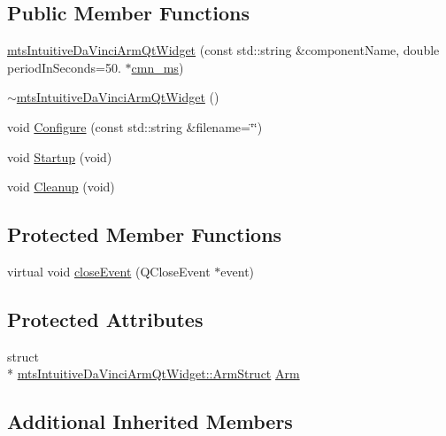 \subsection*{Public Member Functions}
\begin{DoxyCompactItemize}
\item 
\hyperlink{classmts_intuitive_da_vinci_arm_qt_widget_a7e774607fa791454a8e436937404a1ec}{mts\-Intuitive\-Da\-Vinci\-Arm\-Qt\-Widget} (const std\-::string \&component\-Name, double period\-In\-Seconds=50. $\ast$\hyperlink{cmn_units_8h_aaf4d3f2fafb9b4a95606544b9d876b4a}{cmn\-\_\-ms})
\item 
\hyperlink{classmts_intuitive_da_vinci_arm_qt_widget_a3bdf073035b4abc7b533f66a073bfc50}{$\sim$mts\-Intuitive\-Da\-Vinci\-Arm\-Qt\-Widget} ()
\item 
void \hyperlink{classmts_intuitive_da_vinci_arm_qt_widget_ad8228e228cddf61ac848b5799785fb23}{Configure} (const std\-::string \&filename=\char`\"{}\char`\"{})
\item 
void \hyperlink{classmts_intuitive_da_vinci_arm_qt_widget_a650fc8e658ab975458072974e77b46f9}{Startup} (void)
\item 
void \hyperlink{classmts_intuitive_da_vinci_arm_qt_widget_ad8d66f1c511581101f3fb1512bbd6d2b}{Cleanup} (void)
\end{DoxyCompactItemize}
\subsection*{Protected Member Functions}
\begin{DoxyCompactItemize}
\item 
virtual void \hyperlink{classmts_intuitive_da_vinci_arm_qt_widget_aab5e40c10f4f3164ab37344ef2ab0058}{close\-Event} (Q\-Close\-Event $\ast$event)
\end{DoxyCompactItemize}
\subsection*{Protected Attributes}
\begin{DoxyCompactItemize}
\item 
struct \\*
\hyperlink{structmts_intuitive_da_vinci_arm_qt_widget_1_1_arm_struct}{mts\-Intuitive\-Da\-Vinci\-Arm\-Qt\-Widget\-::\-Arm\-Struct} \hyperlink{classmts_intuitive_da_vinci_arm_qt_widget_adbbfb1dbfa27d6f5ec694c4e93a710d0}{Arm}
\end{DoxyCompactItemize}
\subsection*{Additional Inherited Members}


